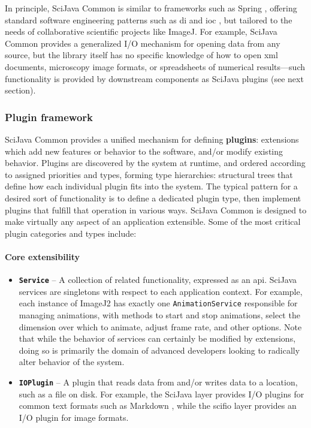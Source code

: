 \documentclass{bmcart}
\begin{document}
In principle, SciJava Common is similar to frameworks such as Spring
\cite{spring}, offering standard software engineering patterns such as
\acrfull{di} \cite{dependency_injection} and \acrfull{ioc} \cite{ioc}, but
tailored to the needs of collaborative scientific projects like ImageJ. For
example, SciJava Common provides a generalized I/O mechanism for opening data
from any source, but the library itself has no specific knowledge of how to
open \acrshort{xml} documents, microscopy image formats, or spreadsheets of
numerical results---such functionality is provided by downstream components as
SciJava plugins (see next section).

\subsubsection*{Plugin framework}
SciJava Common provides a unified mechanism for defining \textbf{plugins}:
extensions which add new features or behavior to the software, and/or modify
existing behavior. Plugins are discovered by the system at runtime, and ordered
according to assigned priorities and types, forming type hierarchies:
structural trees that define how each individual plugin fits into the system.
The typical pattern for a desired sort of functionality is to define a
dedicated plugin type, then implement plugins that fulfill that operation in
various ways. SciJava Common is designed to make virtually any aspect of an
application extensible. Some of the most critical plugin categories and types
include:

\paragraph*{Core extensibility}
\begin{itemize}
  \item \textbf{\texttt{Service}} -- A collection of related functionality,
    expressed as an \acrfull{api}. SciJava services are singletons with respect
    to each application context. For example, each instance of ImageJ2 has
    exactly one \texttt{AnimationService} responsible for managing animations,
    with methods to start and stop animations, select the dimension over which
    to animate, adjust frame rate, and other options. Note that while the
    behavior of services can certainly be modified by extensions, doing so is
    primarily the domain of advanced developers looking to radically alter
    behavior of the system.
  \item \textbf{\texttt{IOPlugin}} -- A plugin that reads data from and/or
    writes data to a location, such as a file on disk. For example, the SciJava
    layer provides I/O plugins for common text formats such as Markdown
    \cite{markdown}, while the \acrshort{scifio} layer provides an I/O plugin
    for image formats.
\end{itemize}
\end{document}
